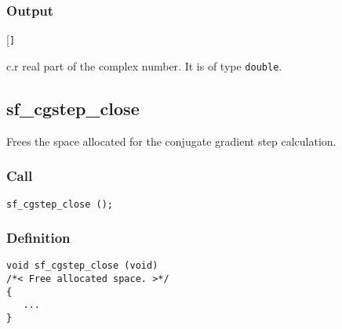 \subsubsection*{Output}
\begin{desclist}{\tt }{\quad}[\tt ]
   \setlength\itemsep{0pt}
   \item[c.r] real part of the complex number. It is of type \texttt{double}.
\end{desclist}




\subsection{{sf\_cgstep\_close}}
Frees the space allocated for the conjugate gradient step calculation.

\subsubsection*{Call}
\begin{verbatim}sf_cgstep_close ();\end{verbatim}

\subsubsection*{Definition}
\begin{verbatim}
void sf_cgstep_close (void) 
/*< Free allocated space. >*/ 
{
   ...
}
\end{verbatim}





